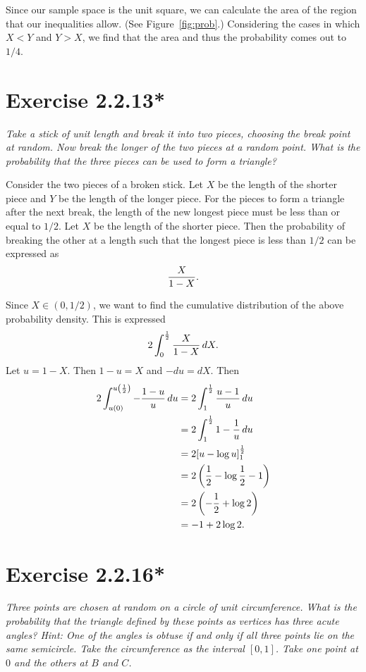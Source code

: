 \documentclass{tufte-handout}
\begin{document}
Since our sample space is the unit square, we can calculate the area
of the region that our inequalities allow. (See
Figure~\ref{fig:prob}.) Considering the cases in which $X<Y$ and
$Y>X$, we find that the area and thus the probability comes out to
$1/4$.

\section{Exercise 2.2.13*}

\emph{Take a stick of unit length and break it into two pieces,
  choosing the break point at random. Now break the longer of the two
  pieces at a random point. What is the probability that the three
  pieces can be used to form a triangle?}

\bigskip

Consider the two pieces of a broken stick. Let $X$ be the length of
the shorter piece and $Y$ be the length of the longer piece. For the
pieces to form a triangle after the next break, the length of the new
longest piece must be less than or equal to $1/2$. Let $X$ be the
length of the shorter piece. Then the probability of breaking the
other at a length such that the longest piece is less than $1/2$ can
be expressed as%
\[ {X \over 1 - X}. \]

Since $X \in (0, 1/2)$, we want to find the cumulative distribution of
the above probability density. This is expressed%
\[ 2\int_0^{1 \over 2} {X \over 1 - X} \, dX.\]%
Let $u = 1 - X$. Then $1 - u = X$ and $-du = dX$. Then
\begin{align*}
  2\int_{u(0)}^{u \left({1 \over 2} \right) } -{1 - u \over u} \, du
  &= 2\int_1^{1 \over 2} {u - 1 \over u} \, du\\
  &= 2\int_1^{1 \over 2} 1 - {1 \over u} \, du\\
  &= 2{\left[ u - \log u \right]}_1^{1 \over 2}\\
  &= 2\left({1 \over 2} - \log {1 \over 2} - 1\right)\\
  &= 2 \left( -{1 \over 2} + \log 2 \right)\\
  &= -1 + 2 \log 2.
\end{align*}

\section{Exercise 2.2.16*}

\emph{Three points are chosen \emph{at random} on a circle of
  \emph{unit circumference}. What is the probability that the triangle
  defined by these points as vertices has three acute angles?
  \emph{Hint}: One of the angles is obtuse if and only if all three
  points lie on the same semicircle. Take the circumference as the
  interval $[0,1]$. Take one point at $0$ and the others at $B$ and
  $C$.}
\end{document}
